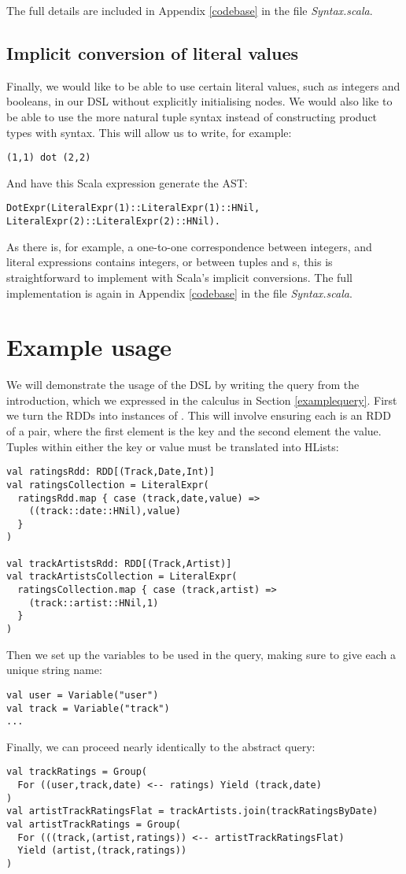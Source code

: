 The full details are included in Appendix \ref{codebase} in the file \textit{Syntax.scala}.

\subsection{Implicit conversion of literal values}

Finally, we would like to be able to use certain literal values, such as integers and booleans, in our DSL without explicitly initialising  nodes. We would also like to be able to use the more natural tuple syntax instead of constructing product types with  syntax. This will allow us to write, for example:
\vs\begin{lstlisting}
(1,1) dot (2,2)
\end{lstlisting}\vs
And have this Scala expression generate the AST:
\vs\begin{lstlisting}
DotExpr(LiteralExpr(1)::LiteralExpr(1)::HNil, LiteralExpr(2)::LiteralExpr(2)::HNil).
\end{lstlisting}\vs
As there is, for example, a one-to-one correspondence between integers, and literal expressions contains integers, or between tuples and s, this is straightforward to implement with Scala's implicit conversions. The full implementation is again in Appendix \ref{codebase} in the file \textit{Syntax.scala}.
\section{Example usage}
We will demonstrate the usage of the DSL by writing the query from the introduction, which we expressed in the calculus in Section \ref{examplequery}. First we turn the RDDs into instances of . This will involve ensuring each is an RDD of a pair, where the first element is the key and the second element the value. Tuples within either the key or value must be translated into HLists:
\begin{lstlisting}
val ratingsRdd: RDD[(Track,Date,Int)]
val ratingsCollection = LiteralExpr(
  ratingsRdd.map { case (track,date,value) =>
    ((track::date::HNil),value)
  }
)

val trackArtistsRdd: RDD[(Track,Artist)]
val trackArtistsCollection = LiteralExpr(
  ratingsCollection.map { case (track,artist) =>
    (track::artist::HNil,1)
  }
)
\end{lstlisting}
Then we set up the variables to be used in the query, making sure to give each a unique string name:
\begin{lstlisting}
val user = Variable("user")
val track = Variable("track")
...
\end{lstlisting} 
Finally, we can proceed nearly identically to the abstract query:
\begin{lstlisting}
val trackRatings = Group(
  For ((user,track,date) <-- ratings) Yield (track,date)
)
val artistTrackRatingsFlat = trackArtists.join(trackRatingsByDate)
val artistTrackRatings = Group(
  For (((track,(artist,ratings)) <-- artistTrackRatingsFlat)
  Yield (artist,(track,ratings))
)
\end{lstlisting}

